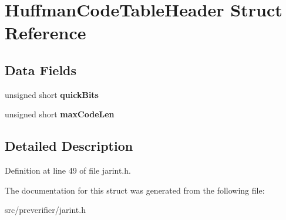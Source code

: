 \section{HuffmanCodeTableHeader Struct Reference}
\label{struct_huffman_code_table_header}
\subsection*{Data Fields}
\begin{DoxyCompactItemize}
\item 
unsigned short {\bfseries quickBits}\label{struct_huffman_code_table_header_a1b3b67e5da342ba131af5c8eb01a3865}

\item 
unsigned short {\bfseries maxCodeLen}\label{struct_huffman_code_table_header_a01e3bd442a58028ed0292a15b4da66a0}

\end{DoxyCompactItemize}


\subsection{Detailed Description}


Definition at line 49 of file jarint.h.



The documentation for this struct was generated from the following file:\begin{DoxyCompactItemize}
\item 
src/preverifier/jarint.h\end{DoxyCompactItemize}
